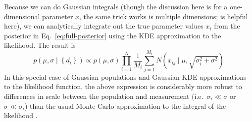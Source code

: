 \documentclass[modern]{aastex631}
\begin{document}
Because we can do Gaussian integrals (though the discussion here is for a
one-dimensional parameter $x$, the same trick works is multiple dimensions;
\citet{Hogg2020} is helpful here), we can analytically integrate out the true
parameter values $x_i$ from the posterior in Eq.\ \eqref{eq:full-posterior}
using the \ac{KDE} approximation to the likelihood. The result is 
\begin{equation}
    p\left( \mu, \sigma \mid \left\{ d_i \right\} \right) \propto p\left( \mu, \sigma \right) \prod_{i=1}^N \frac{1}{M_i} \sum_{j=1}^{M_i} N\left( x_{ij} \mid \mu, \sqrt{\sigma_i^2 + \sigma^2} \right)
\end{equation}
In this special case of Gaussian populations and Gaussian \ac{KDE}
approximations to the likelihood function, the above expression is considerably
more robust to differences in scale between the population and measurement
(i.e.\ $\sigma_i \ll \sigma$ or $\sigma \ll \sigma_i$) than the usual
Monte-Carlo approximation to the integral of the likelihood
\citep[e.g.][]{Miller2020}.


\end{document}
